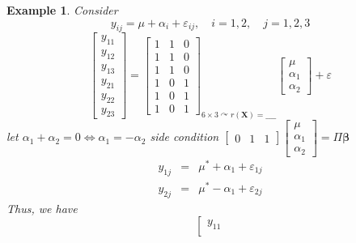 \documentclass{article}
\newtheorem{example}[theorem]{Example}
\begin{document}
\begin{example}
Consider%
\begin{equation*}
y_{ij}=\mu +\alpha _{i}+\varepsilon _{ij},\quad i=1,2,\quad j=1,2,3
\end{equation*}%
\begin{equation*}
\left[ 
\begin{array}{c}
y_{11} \\ 
y_{12} \\ 
y_{13} \\ 
y_{21} \\ 
y_{22} \\ 
y_{23}%
\end{array}%
\right] =\left[ 
\begin{array}{ccc}
1 & 1 & 0 \\ 
1 & 1 & 0 \\ 
1 & 1 & 0 \\ 
1 & 0 & 1 \\ 
1 & 0 & 1 \\ 
1 & 0 & 1%
\end{array}%
\right] _{6\times 3\curvearrowright r\left( \mathbf{X}\right) =\_\_\_\_}%
\left[ 
\begin{array}{c}
\mu  \\ 
\alpha _{1} \\ 
\alpha _{2}%
\end{array}%
\right] +\varepsilon 
\end{equation*}%
\newline
let $\alpha _{1}+\alpha _{2}=0\Leftrightarrow \alpha _{1}=-\alpha _{2}$%
\newline
\newline
side condition $\left[ 
\begin{array}{ccc}
0 & 1 & 1%
\end{array}%
\right] \left[ 
\begin{array}{c}
\mu  \\ 
\alpha _{1} \\ 
\alpha _{2}%
\end{array}%
\right] =\Pi \mathbf{\beta }$%
\begin{eqnarray*}
y_{1j} &=&\mu ^{\ast }+\alpha _{1}+\varepsilon _{1j} \\
y_{2j} &=&\mu ^{\ast }-\alpha _{1}+\varepsilon _{2j}
\end{eqnarray*}%
\newline
Thus, we have%
\begin{equation*}
\left[ 
\begin{array}{c}
y_{11} \\ 

\end{array}
\end{equation*}
\end{example}
\end{document}
